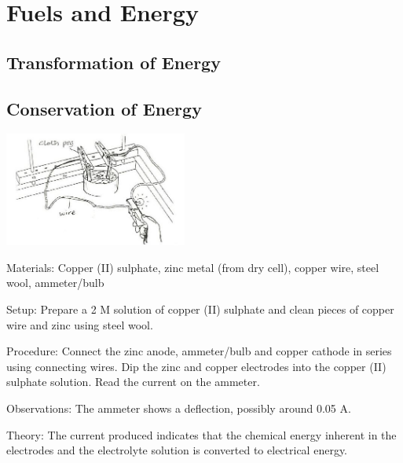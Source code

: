 \section{Fuels and Energy}

\begin{multicols}{2}


\section*{Transformation of Energy}


\subsection{Conservation of Energy} %

\begin{center}
\includegraphics[width=0.45\textwidth]{./img/source/chem-energy.jpg}
\end{center}

\begin{description*}
\item[Materials:]{Copper (II) sulphate, zinc metal (from dry cell), copper wire, steel wool, ammeter/bulb}
\item[Setup:]{Prepare a 2 M solution of copper (II) sulphate and clean pieces of copper wire and zinc using steel wool.}
\item[Procedure:]{Connect the zinc anode, ammeter/bulb and copper cathode in series using connecting wires. Dip the zinc and copper electrodes into the copper (II) sulphate solution. Read the current on the ammeter.}
\item[Observations:]{The ammeter shows a deflection, possibly around 0.05 A.}
\item[Theory:]{The current produced indicates that the chemical energy inherent in the electrodes and the electrolyte solution is converted to electrical energy.}
\end{description*}


\end{multicols}
